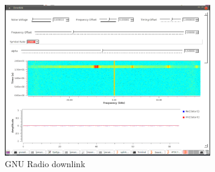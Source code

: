 \begin{figure}
	\includegraphics[width=0.8\textwidth]{gs/img/downlink.png}
	\caption{\label{fig:gs:downlink} GNU Radio downlink}
\end{figure}